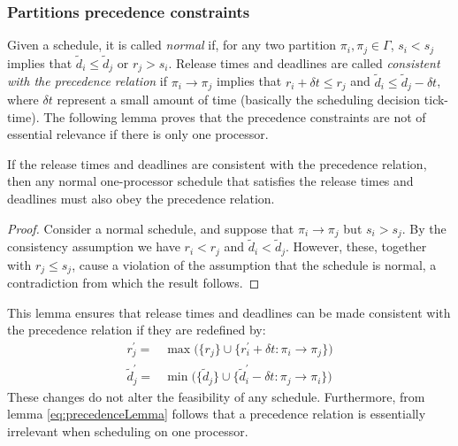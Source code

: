 \subsubsection{Partitions precedence constraints}
\par Given a schedule, it is called \emph{normal} if, for any two partition $\pi_i,\pi_j\in\Gamma$, $s_i<s_j$ implies that $\widetilde{d}_i\leq\widetilde{d}_j$ or $r_j>s_i$. Release times and deadlines are called \emph{consistent with the precedence relation} if $\pi_i\to\pi_j$ implies that $r_i+\delta t\leq r_j$ and $\widetilde{d}_i\leq\widetilde{d}_j-\delta t$, where $\delta t$ represent a small amount of time (basically the scheduling decision tick-time). The following lemma proves that the precedence constraints are not of essential relevance if there is only one processor.
\begin{lemma}\label{eq:precedenceLemma}
If the release times and deadlines are consistent with the precedence relation, then any normal one-processor schedule that satisfies the release times and deadlines must also obey the precedence relation. 
\end{lemma}
\begin{proof}
Consider a normal schedule, and suppose that $\pi_i\to\pi_j$ but $s_i>s_j$. By the consistency assumption we have $r_i<r_j$ and $\widetilde{d}_i<\widetilde{d}_j$. However, these, together with $r_j\leq s_j$, cause a violation of the assumption that the schedule is normal, a contradiction from which the result follows.
\end{proof}
This lemma ensures that release times and deadlines can be made consistent with the precedence relation if they are redefined by:
\begin{align}\label{eq:precedence}
r^{'}_{j} = & \max\big(\{r_j\}\cup\{r^{'}_i+\delta t:\pi_i\to\pi_j\} \big) \\
\widetilde{d}^{'}_j = & \min\big(\{\widetilde{d}_j\}\cup\{\widetilde{d}^{'}_i-\delta t:\pi_j\to\pi_i\} \big)
\end{align}
These changes do not alter the feasibility of any schedule. Furthermore, from lemma \ref{eq:precedenceLemma} follows that a precedence relation is essentially irrelevant when scheduling on one processor. 

